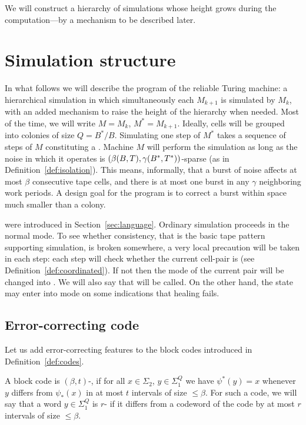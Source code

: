 \documentclass[11pt]{memoir}
\theoremstyle{definition} %
\renewcommand{\le}{\leq}
\def\B{B}
\newcommand{\Q}{Q} %
\newcommand{\Tu}{T}
\newcommand{\Tus}{T^{*}}
\begin{document}
We will construct a hierarchy of simulations whose height grows during the
computation---by a mechanism to be described later.


\section{Simulation structure}\label{sec:sim-struc}

In what follows we will describe the program of the reliable Turing machine:
a hierarchical simulation in which simultaneously each \( M_{k+1} \) is simulated
by \( M_{k} \), with an added mechanism to
raise the height of the hierarchy when needed.
Most of the time, we will write \( M=M_{k} \),  \( M^{*}=M_{k+1} \).
Ideally, cells will be grouped into colonies of size \( \Q=\B^{*}/\B \).
Simulating one step of \( M^{*} \) takes a sequence of steps of \( M \)
constituting a .
Machine \( M \) will perform the simulation as long as the noise
in which it operates is \( (\beta\pair{\B}{\Tu}, \gamma\pair{\B^{*}}{\Tus}) \)-sparse
(as in Definition~\ref{def:isolation}).
This means, informally, that a burst of noise affects at most \( \beta \) consecutive tape cells,  
and there is at most one burst in any \( \gamma \)  neighboring work periods.
A design goal for the program is to
correct a burst within space much smaller than a colony.

 were introduced in Section~\ref{sec:language}.
Ordinary simulation proceeds in the normal mode. 
To see whether consistency, that is the basic tape pattern
supporting simulation, is broken somewhere, a very local precaution will be taken in each step:
each step will check whether the current cell-pair is 
(see Definition~\ref{def:coordinated}).
If not then the mode of the current pair will be changed into .
We will also say that  will be called.
On the other hand, the state may enter into  mode on some indications that
healing fails.


\subsection{Error-correcting code}\label{sec:coding}

Let us add error-correcting features to the block codes introduced in
Definition~\ref{def:codes}.

\begin{sloppypar}
\begin{definition}\label{def:err-code}
A block code is \( (\beta,t) \)-,
if for all \( x\in\Sigma_{2} \), \( y\in\Sigma_{1}^{\Q} \) we
have \( \psi^{*}(y)=x \) whenever \( y \) differs from
\( \psi_{*}(x) \) in at most \( t \) intervals of size \( \le\beta \).
For such a code, we will say that a word \( y\in\Sigma_{1}^{\Q} \) is \( r \)-
if it differs from a codeword of the code by at most \( r \) intervals of size \( \le\beta \).
\end{definition}
  \end{sloppypar}
\end{document}
